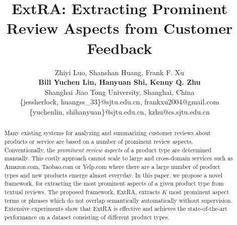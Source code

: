 \documentclass[11pt,a4paper]{article}
\title{ExtRA: Extracting Prominent Review Aspects from Customer Feedback}
\begin{document}

\author{
	Zhiyi Luo, Shanshan Huang, Frank F. Xu\\
	\textbf{ Bill Yuchen Lin, Hanyuan Shi, Kenny Q. Zhu }\\
	Shanghai Jiao Tong University, Shanghai, China\\
	\{jessherlock,
	huangss\_33\}@sjtu.edu.cn,
	frankxu2004@gmail.com \\
	\{yuchenlin, shihanyuan\}@sjtu.edu.cn,
	kzhu@cs.sjtu.edu.cn \\
}

\maketitle

\begin{abstract}
Many existing systems for analyzing and summarizing customer reviews about 
products or service are based on a number of prominent review aspects. 
Conventionally, the {\em prominent review aspects} of a product type 
are determined manually. This costly approach cannot scale to large and 
cross-domain services such as Amazon.com, Taobao.com or Yelp.com where 
there are a large number of product types and
new products emerge almost everyday. 
In this paper, we propose a novel framework, for extracting the 
most prominent aspects of a given product type  from textual reviews. 
The proposed framework, ExtRA, extracts $K$ most prominent aspect terms 
or phrases which do not overlap semantically automatically without
supervision.
Extensive experiments show that ExtRA is effective and achieves the state-of-the-art performance on a dataset consisting of different product types. 
\end{abstract}
\end{document}
